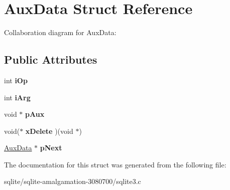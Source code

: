 \hypertarget{struct_aux_data}{\section{Aux\+Data Struct Reference}
\label{struct_aux_data}
}


Collaboration diagram for Aux\+Data\+:
\subsection*{Public Attributes}
\begin{DoxyCompactItemize}
\item 
\hypertarget{struct_aux_data_aaa45d5e867df81e58b886f4fe355364f}{int {\bfseries i\+Op}}\label{struct_aux_data_aaa45d5e867df81e58b886f4fe355364f}

\item 
\hypertarget{struct_aux_data_aa0f1b63cbd4f0cf17c82d9ed17bbdc01}{int {\bfseries i\+Arg}}\label{struct_aux_data_aa0f1b63cbd4f0cf17c82d9ed17bbdc01}

\item 
\hypertarget{struct_aux_data_a3867fd2bd1f3795b14e858daa6754825}{void $\ast$ {\bfseries p\+Aux}}\label{struct_aux_data_a3867fd2bd1f3795b14e858daa6754825}

\item 
\hypertarget{struct_aux_data_a05a1344da15f7ecf6c11f049e2b88bde}{void($\ast$ {\bfseries x\+Delete} )(void $\ast$)}\label{struct_aux_data_a05a1344da15f7ecf6c11f049e2b88bde}

\item 
\hypertarget{struct_aux_data_af63a17e0ce6af2de969caccb25ef3945}{\hyperlink{struct_aux_data}{Aux\+Data} $\ast$ {\bfseries p\+Next}}\label{struct_aux_data_af63a17e0ce6af2de969caccb25ef3945}

\end{DoxyCompactItemize}


The documentation for this struct was generated from the following file\+:\begin{DoxyCompactItemize}
\item 
sqlite/sqlite-\/amalgamation-\/3080700/sqlite3.\+c\end{DoxyCompactItemize}
